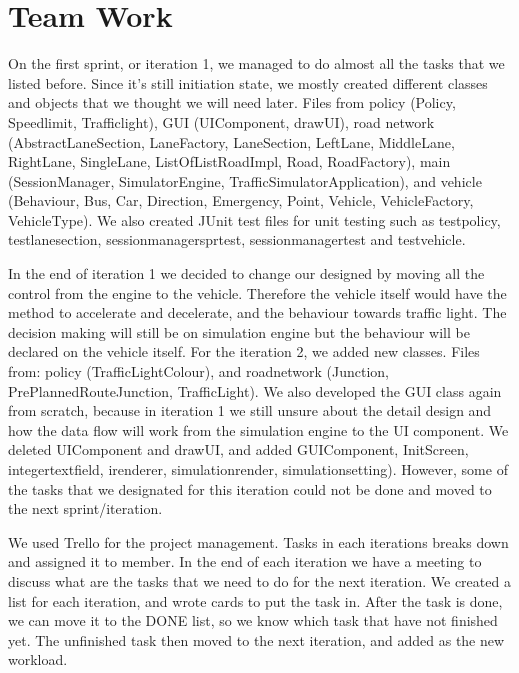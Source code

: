 \documentclass[11pt]{article}
\begin{document}
{\section{Team Work}
On the first sprint, or iteration 1, we managed to do almost all the tasks that we listed before. Since it's still initiation state, we mostly created different classes and objects that we thought we will need later. Files from policy (Policy, Speedlimit, Trafficlight), GUI (UIComponent, drawUI), road network (AbstractLaneSection, LaneFactory, LaneSection, LeftLane, MiddleLane, RightLane, SingleLane, ListOfListRoadImpl, Road, RoadFactory), main (SessionManager, SimulatorEngine, TrafficSimulatorApplication), and vehicle (Behaviour, Bus, Car, Direction, Emergency, Point, Vehicle, VehicleFactory, VehicleType). We also created JUnit test files for unit testing such as testpolicy, testlanesection, sessionmanagersprtest, sessionmanagertest and testvehicle. 

In the end of iteration 1 we decided to change our designed by moving all the control from the engine to the vehicle. Therefore the vehicle itself would have the method to accelerate and decelerate, and the behaviour towards traffic light. The decision making will still be on simulation engine but the behaviour will be declared on the vehicle itself. 
For the iteration 2, we added new classes. Files from: policy (TrafficLightColour), and roadnetwork (Junction, PrePlannedRouteJunction, TrafficLight). We also developed the GUI class again from scratch, because in iteration 1 we still unsure about the detail design and how the data flow will work from the simulation engine to the UI component. We deleted UIComponent and drawUI, and added GUIComponent, InitScreen, integertextfield, irenderer, simulationrender, simulationsetting). However, some of the tasks that we designated for this iteration could not be done and moved to the next sprint/iteration.  

We used Trello for the project management. Tasks in each iterations breaks down and assigned it to member. In the end of each iteration we have a meeting to discuss what are the tasks that we need to do for the next iteration. We created a list for each iteration, and wrote cards to put the task in. After the task is done, we can move it to the DONE list, so we know which task that have not finished yet. The unfinished task then moved to the next iteration, and added as the new workload.

}
\end{document}

